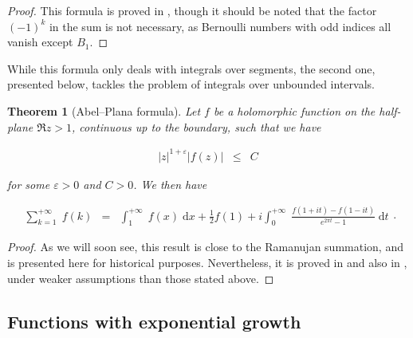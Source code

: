 \documentclass{jams-l}
\newtheorem{theorem}{Theorem}[section]
\theoremstyle{definition}
\theoremstyle{remark}
\numberwithin{equation}{section}
\begin{document}
        \begin{proof}
        
            This formula is proved in \cite[Sec. 1.1]{MR3677185}, though it should be noted that the factor $\left( -1 \right)^k$ in the sum is not necessary, as Bernoulli numbers with odd indices all vanish except $B_1$.
        
        \end{proof}
        
        While this formula only deals with integrals over segments, the second one, presented below, tackles the problem of integrals over unbounded intervals.
        
        \begin{theorem}[Abel--Plana formula]
        
            Let $f$ be a holomorphic function on the half-plane $\Re z > 1$, continuous up to the boundary, such that we have
            
            \[ \begin{array}{ccc}
                    \left \vert z \right \vert^{1+\varepsilon} \left \vert f \left( z \right) \right \vert & \leqslant & C
                \end{array} \]
            
            \noindent for some $\varepsilon > 0$ and $C > 0$. We then have
            
            \[ \begin{array}{ccc}
                    \sum\limits_{k=1}^{+ \infty} \; f \left( k \right) & = & \int_1^{+\infty} \; f \left( x \right) \; \mathrm{d}x + \frac{1}{2} f \left( 1 \right) + i \int_0^{+ \infty} \; \frac{f \left( 1+it \right) - f \left( 1-it \right)}{e^{2 \pi t} - 1} \; \mathrm{d}t
                \end{array} . \]
        
        \end{theorem}
        
        \begin{proof}
        
            As we will soon see, this result is close to the Ramanujan summation, and is presented here for historical purposes. Nevertheless, it is proved in \cite[Sec. 1.4.2]{MR3677185} and also in \cite[Sec.8.3.1]{MR1429619}, under weaker assumptions than those stated above.
        
        \end{proof}
    
    
    \subsection{Functions with exponential growth}
    
\end{document}

